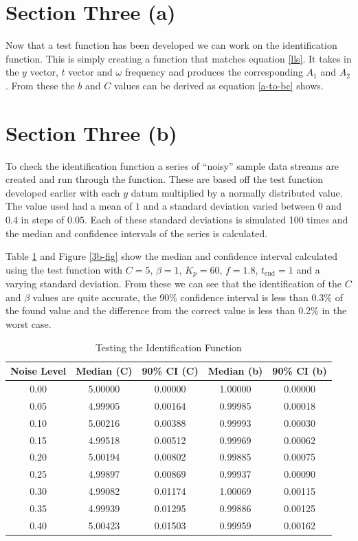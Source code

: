 \section*{Section Three (a)}

Now that a test function has been developed we can work on the identification
function.  This is simply creating a function that matches equation \ref{lls}.
It takes in the $y$ vector, $t$ vector and $\omega$ frequency and produces the
corresponding $A_1$ and $A_2$.  From these the $b$ and $C$ values can be derived
as equation \ref{a-to-bc} shows.

\section*{Section Three (b)}

To check the identification function a series of ``noisy'' sample data streams
are created and run through the function.  These are based off the test function
developed earlier with each $y$ datum multiplied by a normally distributed
value.  The value used had a mean of $1$ and a standard deviation varied between
$0$ and $0.4$ in steps of $0.05$.  Each of these standard deviations is
simulated 100 times and the median and confidence intervals of the series is
calculated.

Table \ref{3b} and Figure \ref{3b-fig} show the median and confidence interval
calculated using the test function with $C = 5$, $\beta = 1$, $K_p = 60$, $f =
1.8$, $t_\text{end} = 1$ and a varying standard deviation.  From these we can
see that the identification of the $C$ and $\beta$ values are quite accurate,
the 90\% confidence interval is less than 0.3\% of the found value and the
difference from the correct value is less than 0.2\% in the worst case.

\begin{table}
\centering
\begin{tabular}{c|c|c|c|c}
Noise Level & Median (C) & 90\% CI (C) & Median (b) & 90\% CI (b) \\
\hline
0.00 & 5.00000 & 0.00000 & 1.00000 & 0.00000 \\
0.05 & 4.99905 & 0.00164 & 0.99985 & 0.00018 \\
0.10 & 5.00216 & 0.00388 & 0.99993 & 0.00030 \\
0.15 & 4.99518 & 0.00512 & 0.99969 & 0.00062 \\
0.20 & 5.00194 & 0.00802 & 0.99885 & 0.00075 \\
0.25 & 4.99897 & 0.00869 & 0.99937 & 0.00090 \\
0.30 & 4.99082 & 0.01174 & 1.00069 & 0.00115 \\
0.35 & 4.99939 & 0.01295 & 0.99886 & 0.00125 \\
0.40 & 5.00423 & 0.01503 & 0.99959 & 0.00162  
\end{tabular}
\caption{Testing the Identification Function\label{3b}}
\end{table}

